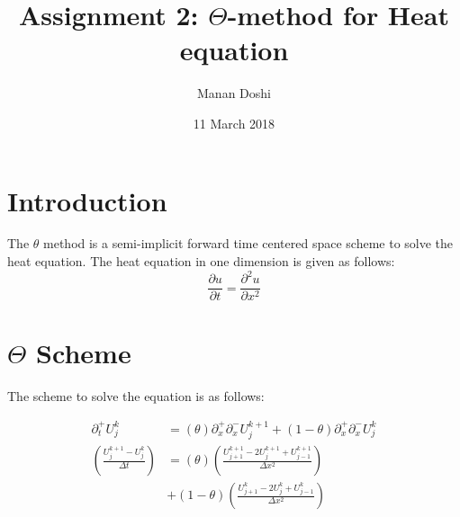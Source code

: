 \documentclass{article}
\title{Assignment 2: $\Theta$-method for Heat equation}
\author{Manan Doshi}
\date{11 March 2018}
\begin{document}
\graphicspath{{/}}
\maketitle

\section{Introduction}
The $\theta$ method is a semi-implicit forward time centered space scheme to solve the heat equation. The heat equation in one dimension is given as follows:
\[
\frac{\partial u}{\partial t} = \frac{\partial^2 u}{\partial x^2}
\]

\section{$\Theta$ Scheme}
The scheme to solve the equation is as follows:

\begin{align*}
    \partial_t^{+}U_j^k &= (\theta) \partial_x^{+}\partial_x^{-}U_j^{k+1} + (1-\theta) \partial_x^{+}\partial_x^{-}U_j^k \\[1em]
    \left(\frac{U_j^{k+1} - U_j^k}{\Delta t}\right) &= (\theta) \left(\frac{U^{k+1}_{j+1} - 2 U_j^{k+1} + U^{k+1}_{j-1}}{\Delta x^2}\right) 
                    \\&+ (1-\theta)\left(\frac{U^{k}_{j+1} - 2 U_j^{k} + U^{k}_{j-1}}{\Delta x^2}\right) \\
\end{align*}
\end{document}
